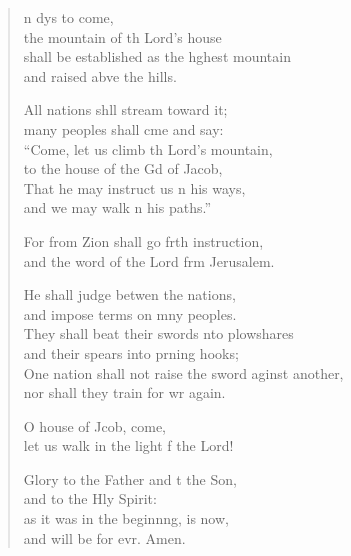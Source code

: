 \begin{verse}
  \begin{patverse}
n dys to come,\Med\\
the mountain of th Lord’s house\\
shall be established as the h\pointup{\i}ghest mountain\Med\\
and raised abve the hills.

All nations shll stream toward it;\Med\\
many peoples shall cme and say:\\
“Come, let us climb th Lord’s mountain,\Med\\
to the house of the Gd of Jacob,\\
That he may instruct us \pointup{\i}n his ways, \Med\\
and we may walk \pointup{\i}n his paths.”

For from Zion shall go frth instruction,\Med\\
and the word of the Lord frm Jerusalem.

He shall judge betwen the nations,\Med\\
and impose terms on mny peoples.\\
They shall beat their swords \pointup{\i}nto plowshares\Med\\
and their spears into prning hooks;\\
One nation shall not raise the sword aginst another,\Med\\
nor shall they train for wr again.

O house of Jcob, come,\Med\\
let us walk in the light f the Lord!

Glory to the Father and t the Son,\Med\\
    and to the Hly Spirit:\\
as it was in the beginn\pointup{\i}ng, is now,\Med\\
    and will be for evr. Amen.
  \end{patverse}
\end{verse}
